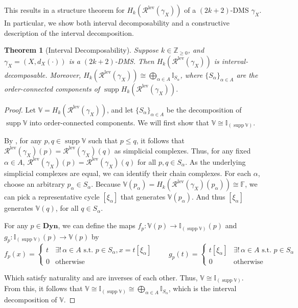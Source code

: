 \documentclass[a4paper,UKenglish,thm-restate]{article}
\newtheorem{theorem}{Theorem}[section]
\theoremstyle{definition}
\def\bbv{\mathbb{V}}
\def\bdyn{\mathbf{Dyn}}
\DeclareMathOperator{\supp}{supp}
\begin{document}
    This results in a structure theorem for $H_k(\mathcal{R}^{\mathrm{lev}}(\gamma_X))$ of a $(2k+2)$-DMS $\gamma_X$. In particular, we show both interval decomposability and a constructive description of the interval decomposition.
    \begin{theorem}[Interval Decomposability] \label{thm:intervaldecomp}
        Suppose $k \in \mathbb{Z}_{\geq 0}$, and $\gamma_X = (X, d_X(\cdot))$ is a $(2k+2)$-DMS. Then $H_k(\mathcal{R}^{\mathrm{lev}}(\gamma_X))$ is interval-decomposable. Moreover, $H_k(\mathcal{R}^{\mathrm{lev}}(\gamma_X)) \cong \bigoplus_{\alpha \in A} \mathbb{I}_{S_\alpha}$, where $\{S_\alpha\}_{\alpha \in A}$ are the order-connected components of $\supp H_k(\mathcal{R}^{\mathrm{lev}}(\gamma_X))$.
    \end{theorem}
    \begin{proof}
        Let $\bbv = H_k(\mathcal{R}^{\mathrm{lev}}(\gamma_X))$, and let $\{S_\alpha\}_{\alpha \in A}$ be the decomposition of $\supp \bbv$ into order-connected components. We will first show that $\bbv \cong \mathbb{I}_{(\supp \bbv)}$.

        By , for any $p, q \in \supp \bbv$ such that $p \leq q$, it follows that $\mathcal{R}^{\mathrm{lev}}(\gamma_X)(p) = \mathcal{R}^{\mathrm{lev}}(\gamma_X)(q)$ as simplicial complexes. Thus, for any fixed $\alpha \in A$, $\mathcal{R}^{\mathrm{lev}}(\gamma_X)(p) = \mathcal{R}^{\mathrm{lev}}(\gamma_X)(q)$ for all $p, q \in S_\alpha$. As the underlying simplicial complexes are equal, we can identify their chain complexes. For each $\alpha$, choose an arbitrary $p_\alpha \in S_\alpha$. Because $\bbv(p_\alpha) = H_k(\mathcal{R}^{\mathrm{lev}}(\gamma_X)(p_\alpha)) \cong \mathbb{F}$, we can pick a representative cycle $[\xi_\alpha]$ that generates $\bbv(p_\alpha)$. And thus $[\xi_\alpha]$ generates $\bbv(q)$, for all $q \in S_\alpha$.

        For any $p \in \bdyn$, we can define the maps $f_p: \bbv(p) \rightarrow \mathbb{I}_{(\supp \bbv)}(p)$ and $g_p: \mathbb{I}_{(\supp \bbv)}(p) \rightarrow \bbv(p)$ by
        \[
            f_p(x) = 
            \begin{cases}
                t & \exists!\, \alpha \in A \text{ s.t. } p \in S_\alpha, x = t [\xi_\alpha] \\
                0 & \text{otherwise}
            \end{cases}
            \qquad
            g_p(t) = 
            \begin{cases}
                t[\xi_\alpha] & \exists! \, \alpha \in A \text{ s.t. } p \in S_\alpha \\
                0 & \text{otherwise}
            \end{cases}
        \]

        Which satisfy naturality and are inverses of each other. Thus, $\bbv \cong \mathbb{I}_{(\supp \bbv)}$. From this, it follows that $\bbv \cong \mathbb{I}_{(\supp \bbv)} \cong \bigoplus_{\alpha \in A} \mathbb{I}_{S_\alpha}$, which is the interval decomposition of $\bbv$.
    \end{proof}
    
\end{document}
